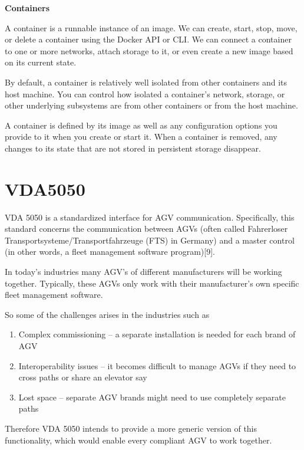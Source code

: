 \textbf{Containers}

A container is a runnable instance of an image. We can create, start, stop, move, or delete a container using the Docker API or CLI. We can connect a container to one or more networks, attach storage to it, or even create a new image based on its current state.

By default, a container is relatively well isolated from other containers and its host machine. You can control how isolated a container’s network, storage, or other underlying subsystems are from other containers or from the host machine.

A container is defined by its image as well as any configuration options you provide to it when you create or start it. When a container is removed, any changes to its state that are not stored in persistent storage disappear.

\section{VDA5050}

VDA 5050 is a standardized interface for AGV communication. Specifically, this standard concerns the communication between AGVs (often called Fahrerloser Transportsysteme/Transportfahrzeuge (FTS) in Germany) and a master control (in other words, a fleet management software program)[9].

In today's industries many AGV's of different manufacturers will be working together. Typically, these AGVs only work with their manufacturer’s own specific fleet management software. 

So some of the challenges arises in the industries such as

\begin{enumerate}
	\item Complex commissioning – a separate installation is needed for each brand of AGV
	\item Interoperability issues – it becomes difficult to manage AGVs if they need to cross paths or share an elevator say
	\item Lost space – separate AGV brands might need to use completely separate paths 
\end{enumerate}

Therefore VDA 5050 intends to provide a more generic version of this functionality, which would enable every compliant AGV to work together.

